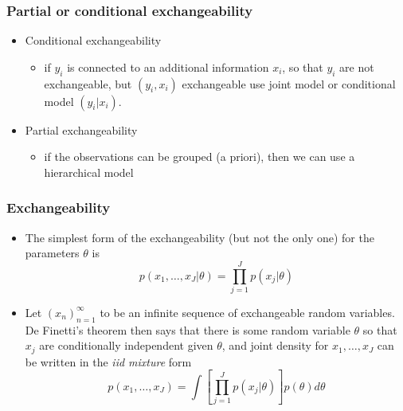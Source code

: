 \documentclass[10pt]{beamer}
\begin{document}
\begin{frame}

\frametitle{Partial or conditional exchangeability}

\begin{itemize}
  \item Conditional exchangeability
    \begin{itemize}
    \item if $y_i$ is connected to an additional information $x_i$, so
      that $y_i$ are not exchangeable, but $(y_i,x_i)$ exchangeable
      use joint model or conditional model $(y_i|x_i)$.
    \end{itemize}
  \item<2-> Partial exchangeability
    \begin{itemize}
    \item if the observations can be grouped (a priori), then we can use a
      hierarchical model
    \end{itemize}
\end{itemize}
\end{frame}

\begin{frame}

\frametitle{Exchangeability}

  \begin{itemize}
  \item The simplest form of the exchangeability (but not the only
    one) for the parameters $\theta$ is 
    \begin{equation*}
      p(x_1,\ldots,x_J|\theta)=\prod_{j=1}^J p(x_j|\theta)
    \end{equation*}
  \item<2-> Let $(x_n)_{n=1}^{\infty}$ to be an infinite sequence of
    exchangeable random variables. De Finetti's theorem then says that
    there is some random variable $\theta$ so that $x_j$ are
    conditionally independent given $\theta$, and joint density for
    $x_1,\ldots,x_J$ can be written in the \textit{iid mixture} form
    \begin{equation*}
      p(x_1,\ldots,x_J)=\int \left[\prod_{j=1}^J p(x_j|\theta)\right]p(\theta)d\theta
    \end{equation*}
   \end{itemize}
\end{frame}


\end{document}
